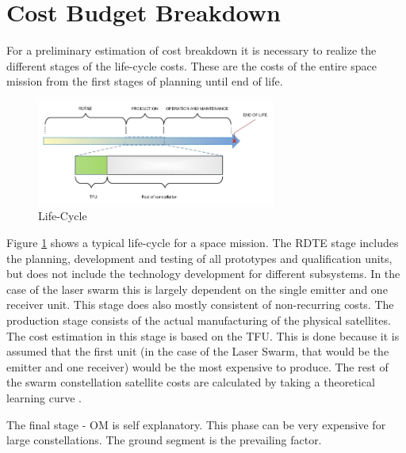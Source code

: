 \section{Cost Budget Breakdown}
\label{blBudgetCost}
For a preliminary estimation of cost breakdown it is necessary to realize the different stages of the life-cycle costs. These are the costs of the entire space mission from the first stages of planning until end of life.
%

\begin{figure}[b]
\begin{center}

\includegraphics[width=0.7\textwidth]{chapters/img/lifetime.jpg}
\caption{Life-Cycle}
\label{fig:lifecycle}
\end{center}
\end{figure}

Figure \ref{fig:lifecycle} shows a typical life-cycle for a space mission. The \ac{RDTE} stage includes the planning, development and testing of all prototypes and qualification units, but does not include the technology development for different subsystems. In the case of the laser swarm this is largely dependent on the single emitter and one receiver unit. This stage does also mostly consistent of non-recurring costs. The production stage consists of the actual manufacturing of the physical satellites. The cost estimation in this stage is based on the \ac{TFU}. This is done because it is assumed that the first unit (in the case of the Laser Swarm, that would be the emitter and one receiver) would be the most expensive to produce. The rest of the swarm constellation satellite costs are calculated by taking a theoretical learning curve \cite{larson}. 

The final stage - \ac{OM} is self explanatory. This phase can be very expensive for large constellations. The ground segment is the prevailing factor.

